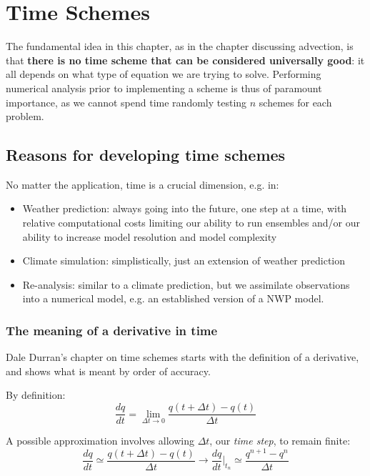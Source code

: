 \chapter{Time Schemes}\label{chapter:Time-Schemes}

The fundamental idea in this chapter, as in the chapter discussing advection, is that {\bf there is no time scheme that can be considered universally good}: it all depends on what type of equation we are trying to solve. Performing numerical analysis prior to implementing a scheme is thus of paramount importance, as we cannot spend time randomly testing $n$ schemes for each problem.

\section{Reasons for developing time schemes}

No matter the application, time is a crucial dimension, e.g. in:
\begin{itemize}
	\item Weather prediction: always going into the future, one step at a time, with relative computational costs limiting our ability to run ensembles and/or our ability to increase model resolution and model complexity
	\item Climate simulation: simplistically, just an extension of weather prediction
	\item Re-analysis: similar to a climate prediction, but we assimilate observations into a numerical model, e.g. an established version of a NWP model.
\end{itemize}

\subsection{The meaning of a derivative in time}

Dale Durran's chapter on time schemes starts with the definition of a derivative, and shows what is meant by order of accuracy.

By definition:
\begin{equation}
	\frac{dq}{dt} = \lim_{\Delta t \to 0}  \frac{q(t+\Delta t)-q(t)}{\Delta t}
\end{equation}

A possible approximation involves allowing $\Delta t$, our \emph{time step}, to remain finite:
\begin{equation}
	\frac{dq}{dt} \simeq  \frac{q(t+\Delta t)-q(t)}{\Delta t} \to 	\frac{dq}{dt}\bigg|_{t_n} \simeq \frac{q^{n+1}-q^n}{\Delta t}
\end{equation}

